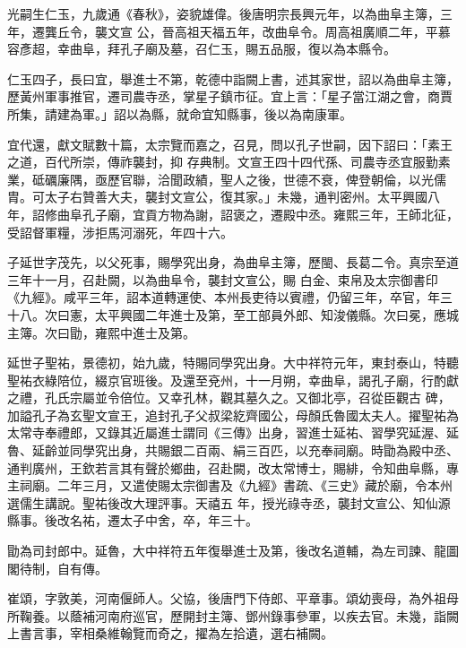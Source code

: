 \begin{pinyinscope}
 光嗣生仁玉，九歲通《春秋》，姿貌雄偉。後唐明宗長興元年，以為曲阜主簿，三年，遷龔丘令，襲文宣
 公，晉高祖天福五年，改曲阜令。周高祖廣順二年，平慕容彥超，幸曲阜，拜孔子廟及墓，召仁玉，賜五品服，復以為本縣令。



 仁玉四子，長曰宜，舉進士不第，乾德中詣闕上書，述其家世，詔以為曲阜主簿，歷黃州軍事推官，遷司農寺丞，掌星子鎮市征。宜上言：「星子當江湖之會，商賈所集，請建為軍。」詔以為縣，就命宜知縣事，後以為南康軍。



 宜代還，獻文賦數十篇，太宗覽而嘉之，召見，問以孔子世嗣，因下詔曰：「素王之道，百代所崇，傳祚襲封，抑
 存典制。文宣王四十四代孫、司農寺丞宜服勤素業，砥礪廉隅，亟歷官聯，洽聞政績，聖人之後，世德不衰，俾登朝倫，以光儒胄。可太子右贊善大夫，襲封文宣公，復其家。」未幾，通判密州。太平興國八年，詔修曲阜孔子廟，宜貢方物為謝，詔褒之，遷殿中丞。雍熙三年，王師北征，受詔督軍糧，涉拒馬河溺死，年四十六。



 子延世字茂先，以父死事，賜學究出身，為曲阜主簿，歷閩、長葛二令。真宗至道三年十一月，召赴闕，以為曲阜令，襲封文宣公，賜
 白金、束帛及太宗御書印《九經》。咸平三年，詔本道轉運使、本州長吏待以賓禮，仍留三年，卒官，年三十八。次曰憲，太平興國二年進士及第，至工部員外郎、知浚儀縣。次曰冕，應城主簿。次曰勖，雍熙中進士及第。



 延世子聖祐，景德初，始九歲，特賜同學究出身。大中祥符元年，東封泰山，特聽聖祐衣綠陪位，綴京官班後。及還至兗州，十一月朔，幸曲阜，謁孔子廟，行酌獻之禮，孔氏宗屬並令倍位。又幸孔林，觀其墓久之。又御北亭，召從臣觀古
 碑，加謚孔子為玄聖文宣王，追封孔子父叔梁紇齊國公，母顏氏魯國太夫人。擢聖祐為太常寺奉禮郎，又錄其近屬進士謂同《三傳》出身，習進士延祐、習學究延渥、延魯、延齡並同學究出身，共賜銀二百兩、絹三百匹，以充奉祠廟。時勖為殿中丞、通判廣州，王欽若言其有聲於鄉曲，召赴闕，改太常博士，賜緋，令知曲阜縣，專主祠廟。二年三月，又遣使賜太宗御書及《九經》書疏、《三史》藏於廟，令本州選儒生講說。聖祐後改大理評事。天禧五
 年，授光祿寺丞，襲封文宣公、知仙源縣事。後改名祐，遷太子中舍，卒，年三十。



 勖為司封郎中。延魯，大中祥符五年復舉進士及第，後改名道輔，為左司諫、龍圖閣待制，自有傳。



 崔頌，字敦美，河南偃師人。父協，後唐門下侍郎、平章事。頌幼喪母，為外祖母所鞠養。以蔭補河南府巡官，歷開封主簿、鄧州錄事參軍，以疾去官。未幾，詣闕上書言事，宰相桑維翰覽而奇之，擢為左拾遺，選右補闕。




\end{pinyinscope}

